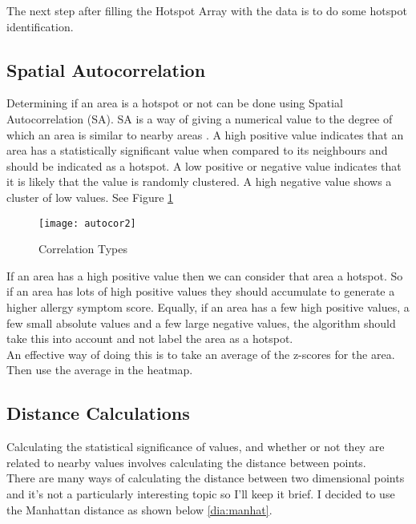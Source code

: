 The next step after filling the Hotspot Array with the data is to do some hotspot identification.

\subsection{Spatial Autocorrelation}

Determining if an area is a hotspot or not can be done using Spatial Autocorrelation (SA). SA is a way of giving a numerical value to the degree of which an area is similar to nearby areas \cite{autocor} . A high positive value indicates that an area has a statistically significant value when compared to its neighbours and should be indicated as a hotspot. A low positive or negative value indicates that it is likely that the value is randomly clustered. A high negative value shows a cluster of low values. See Figure \ref{fig:autocor2}\\

\begin{figure}[H]
\begin{center}
\texttt{[image: autocor2]}
\caption{Correlation Types}
\label{fig:autocor2}
\end{center}
\end{figure}

If an area has a high positive value then we can consider that area a hotspot. So if an area has lots of high positive values they should accumulate to generate a higher allergy symptom score. Equally, if an area has a few high positive values, a few small absolute values and a few large negative values, the algorithm should take this into account and not label the area as a hotspot.\\

An effective way of doing this is to take an average of the z-scores for the area. Then use the average in the heatmap.

\subsection{Distance Calculations}

Calculating the statistical significance of values, and whether or not they are related to nearby values involves calculating the distance between points.\\

There are many ways of calculating the distance between two dimensional points and it's not a particularly interesting topic so I'll keep it brief. I decided to use the Manhattan distance as shown below \ref{dia:manhat}.\\

